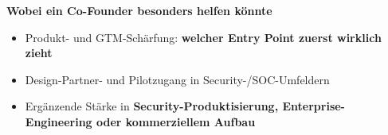 \documentclass[10pt,a4paper]{article}
\begin{document}
\noindent\textbf{Wobei ein Co-Founder besonders helfen könnte}
\begin{itemize}
  \item Produkt- und GTM-Schärfung: \textbf{welcher Entry Point zuerst wirklich zieht}
  \item Design-Partner- und Pilotzugang in Security-/SOC-Umfeldern
  \item Ergänzende Stärke in \textbf{Security-Produktisierung, Enterprise-Engineering oder kommerziellem Aufbau}
\end{itemize}
\end{document}
